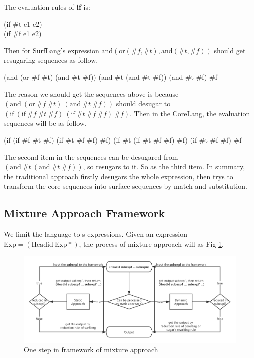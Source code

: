 The evaluation rules of {\bfseries if} is:
\begin{Codes}
(if \#t e1 e2)  \\
(if \#f e1 e2)  
\end{Codes}

Then for SurfLang's expression $\mbox{and}(\mbox{or}(\#f, \#t), \mbox{and}(\#t, \#f))$ should get resugaring sequences as follow.

\begin{Codes}
    (and (or \#f \#t) (and \#t \#f))
\CoreStep (and \#t (and \#t \#f))
\CoreStep (and \#t \#f)
\CoreStep \#f
\end{Codes}

The reason we should get the sequences above is because $(\mbox{and}~(\mbox{or}~\#f~\#t)~(\mbox{and}~\#t~\#f))$ should desugar to $(\mbox{if}~(\mbox{if}~\#f~\#t~\#f)~(\mbox{if}~\#t~\#f~\#f)~\#f)$. Then in the CoreLang, the evaluation sequences will be as follow.
\begin{Codes}
    (if (if \#f \#t \#f) (if \#t \#f \#f) \#f)
\CoreStep (if \#t (if \#t \#f \#f) \#f)
\CoreStep (if \#t \#f \#f)
\CoreStep \#f
\end{Codes}

The second item in the sequences can be desugared from $(\mbox{and}~\#t~(\mbox{and}~\#t~\#f))$, so resugars to it. So as the third item. In summary, the traditional approach firstly desugars the whole expression, then trys to transform the core sequences into surface sequences by match and substitution.

\subsection{Mixture Approach Framework}
We limit the language to s-expressions. Given an expression $\mbox{Exp} = (\mbox{Headid}~\mbox{Exp}*)$, the process of mixture approach will as Fig \ref{fig:mixture}.

\begin{figure}[t]
	\centering
	\includegraphics[width=12cm]{images/mixture.png}
	\caption{One step in framework of mixture approach}
	\label{fig:mixture}
\end{figure}


